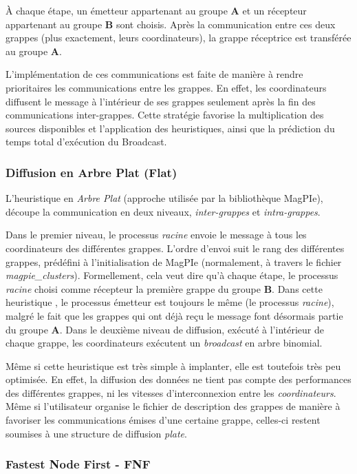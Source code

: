 À chaque étape, un émetteur appartenant au groupe \textbf{A} et un
récepteur appartenant au groupe \textbf{B} sont choisis. Après la
communication entre ces deux grappes (plus exactement, leurs coordinateurs),
la grappe réceptrice est transférée au groupe \textbf{A}. 

L'implémentation de ces communications est faite de manière à rendre
prioritaires les communications entre les grappes. En effet, les coordinateurs
diffusent le message à l'intérieur de ses grappes seulement après
la fin des communications inter-grappes. Cette stratégie favorise
la multiplication des sources disponibles et l'application des heuristiques,
ainsi que la prédiction du temps total d'exécution du Broadcast.


\subsubsection*{Diffusion en Arbre Plat (Flat)}

L'heuristique en \emph{Arbre Plat} (approche utilisée par la bibliothèque
MagPIe), découpe la communication en deux niveaux, \emph{inter-grappes}
et \emph{intra-grappes}. 

Dans le premier niveau, le processus \emph{racine} envoie le message
à tous les coordinateurs des différentes grappes. L'ordre d'envoi
suit le \og rang \fg{} des différentes grappes, prédéfini à l'initialisation
de MagPIe (normalement, à travers le fichier \emph{magpie\_clusters}).
Formellement, cela veut dire qu'à chaque étape, le processus \emph{racine}
choisi comme récepteur la première grappe du groupe \textbf{B}. Dans
cette \og heuristique \fg{}, le processus émetteur est toujours
le même (le processus \emph{racine}), malgré le fait que les grappes
qui ont déjà reçu le message font désormais partie du groupe \textbf{A}.
Dans le deuxième niveau de diffusion, exécuté à l'intérieur de chaque
grappe, les coordinateurs exécutent un \emph{broadcast} en arbre binomial.

Même si cette heuristique est très simple à implanter, elle est toutefois
très peu optimisée. En effet, la diffusion des données ne tient pas
compte des performances des différentes grappes, ni les vitesses d'interconnexion
entre les \emph{coordinateurs}. Même si l'utilisateur organise le
fichier de description des grappes de manière à favoriser les communications
émises d'une certaine grappe, celles-ci restent soumises à une structure
de diffusion \emph{plate}. 


\subsubsection*{Fastest Node First - FNF}

